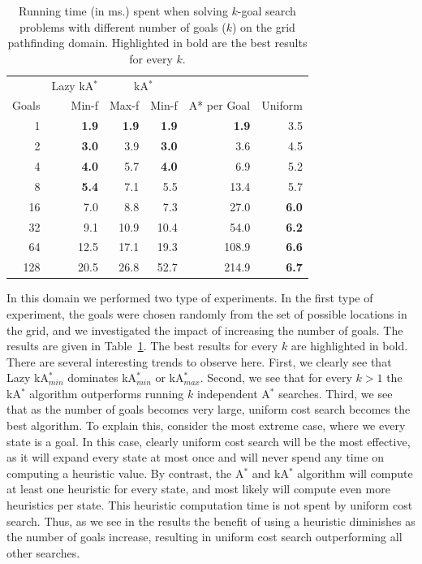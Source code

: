 \documentclass{aicom2e}
\newcommand{\kgs}{$k$-goal search}
\newcommand{\astar}{A$^*$}
\newcommand{\kastar}{kA$^*$}
\newcommand{\kastarmin}{kA$^*_{min}$}
\newcommand{\kastarmax}{kA$^*_{max}$}
\begin{document}
\begin{table}[]
	\centering
	\begin{tabular}{r|r|rr|r|r}
		& \multicolumn{1}{c|}{Lazy \kastar{}} & \multicolumn{2}{c|}{\kastar{}} &             &         \\
		Goals & Min-f                        & Max-f      & Min-f      & A* per Goal & Uniform \\
		\hline
1     & \textbf{1.9}                 & \textbf{1.9} & \textbf{1.9} & \textbf{1.9} & 3.5          \\
2     & \textbf{3.0}                 & 3.9          & \textbf{3.0} & 3.6          & 4.5          \\
4     & \textbf{4.0}                 & 5.7          & \textbf{4.0} & 6.9          & 5.2          \\
8     & \textbf{5.4}                 & 7.1          & 5.5          & 13.4         & 5.7          \\
16    & 7.0                          & 8.8          & 7.3          & 27.0         & \textbf{6.0} \\
32    & 9.1                          & 10.9         & 10.4         & 54.0         & \textbf{6.2} \\
64    & 12.5                         & 17.1         & 19.3         & 108.9        & \textbf{6.6} \\
128   & 20.5                         & 26.8         & 52.7         & 214.9        & \textbf{6.7}  
	\end{tabular}
	\caption{Running time (in ms.) spent when solving \kgs{} problems with different number of goals ($k$) on the grid pathfinding domain. Highlighted in bold are the best results for every $k$.}
	\label{tab:pathfinding-runtime}
\end{table}

In this domain we performed two type of experiments. In the first type of experiment, the goals were chosen randomly from the set of possible locations in the grid, and we investigated the impact of increasing the number of goals. The results are given in Table~\ref{tab:pathfinding-runtime}. The best results for every $k$ are highlighted in bold. There are several interesting trends to observe here. First, we clearly see that Lazy \kastarmin{} dominates \kastarmin{} or \kastarmax{}. Second, we see that for every $k>1$ the \kastar{} algorithm outperforms running $k$ independent \astar{} searches. Third, we see that as the number of goals becomes very large, uniform cost search becomes the best algorithm. To explain this, consider the most extreme case, where we every state is a goal. In this case, clearly uniform cost search will be the most effective, as it will expand every state at most once and will never spend any time on computing a heuristic value. By contrast, the \astar{} and \kastar{} algorithm will compute at least one heuristic for every state, and most likely will compute even more heuristics per state. This heuristic computation time is not spent by uniform cost search. Thus, as we see in the results the benefit of using a heuristic diminishes as the number of goals increase, resulting in uniform cost search outperforming all other searches. 
\end{document}
